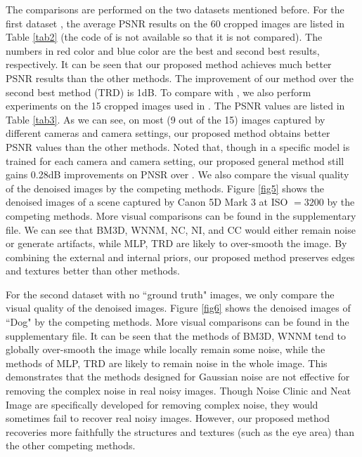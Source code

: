 \documentclass[10pt,twocolumn,letterpaper]{article}
\begin{document}
The comparisons are performed on the two datasets mentioned before. For the first dataset \cite{crosschannel2016}, the average PSNR results on the 60 cropped images  are listed in Table \ref{tab2} (the code of \cite{crosschannel2016} is not available so that it is not compared). The numbers in red color and blue color are the best and second best results, respectively. It can be seen that our proposed method achieves much better PSNR results than the other methods. The improvement of our method over the second best method (TRD) is 1dB. To compare with \cite{crosschannel2016}, we also perform experiments on the 15 cropped images used in \cite{crosschannel2016}. The PSNR values are listed in Table \ref{tab3}. As we can see, on most (9 out of the 15) images captured by different cameras and camera settings, our proposed method obtains better PSNR values than the other methods. Noted that, though in \cite{crosschannel2016} a specific model is trained for each camera and camera setting, our proposed general method still gains 0.28dB improvements on PNSR over \cite{crosschannel2016}. We also compare the visual quality of the denoised images by the competing methods. Figure \ref{fig5} shows the denoised images of a scene captured by Canon 5D Mark 3 at ISO $=3200$ by the competing methods. More visual comparisons can be found in the supplementary file. We can see that BM3D, WNNM, NC, NI, and CC would either remain noise or generate artifacts, while MLP, TRD are likely to over-smooth the image. By combining the external and internal priors, our proposed method preserves edges and textures better than other methods. 

For the second dataset \cite{ncwebsite} with no ``ground truth" images, we only compare the visual quality of the denoised images. Figure \ref{fig6} shows the denoised images of ``Dog" by the competing methods. More visual comparisons can be found in the supplementary file. It can be seen that the methods of BM3D, WNNM tend to globally over-smooth the image while locally remain some noise, while the methods of MLP, TRD are likely to remain noise in the whole image. This demonstrates that the methods designed for Gaussian noise are not effective for removing the complex noise in real noisy images. Though Noise Clinic and Neat Image are specifically developed for removing complex noise, they would sometimes fail to recover real noisy images. However, our proposed method recoveries more faithfully the structures and textures (such as the eye area) than the other competing methods.
\end{document}
